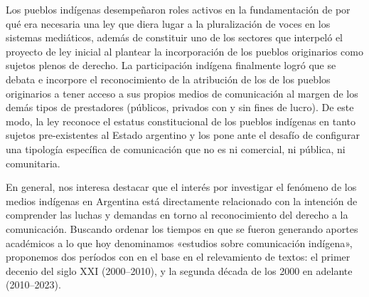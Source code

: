 \documentclass{tufte-handout}
\begin{document}
Los pueblos indígenas desempeñaron roles activos en la fundamentación de
por qué era necesaria una ley que diera lugar a la pluralización de
voces en los sistemas mediáticos, además de constituir uno de los
sectores que interpeló el proyecto de ley inicial al plantear la
incorporación de los pueblos originarios como sujetos plenos de derecho.
La participación indígena finalmente logró que se debata e incorpore el
reconocimiento de la atribución de los de los pueblos originarios a
tener acceso a sus propios medios de comunicación al margen de los demás
tipos de prestadores (públicos, privados con y sin fines de lucro). De
este modo, la ley reconoce el estatus constitucional de los pueblos
indígenas en tanto sujetos pre-existentes al Estado argentino y los pone
ante el desafío de configurar una tipología específica de comunicación
que no es ni comercial, ni pública, ni comunitaria.

\enlargethispage{\baselineskip}

En general, nos interesa destacar que el interés por investigar el
fenómeno de los medios indígenas en Argentina está directamente
relacionado con la intención de comprender las luchas y demandas en
torno al reconocimiento del derecho a la comunicación. Buscando ordenar
los tiempos en que se fueron generando aportes académicos a lo que hoy
denominamos «estudios sobre comunicación indígena», proponemos dos
períodos con en el base en el relevamiento de textos: el primer decenio
del siglo XXI (2000--2010), y la segunda década de los 2000 en adelante
(2010--2023).
\end{document}
